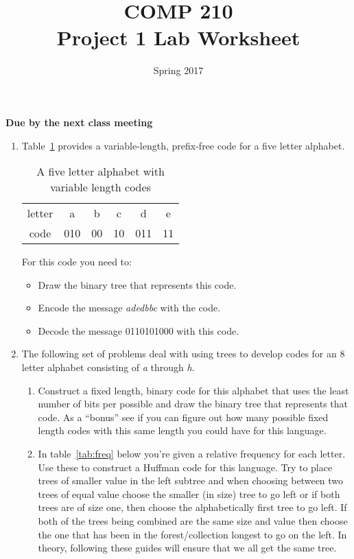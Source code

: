 \documentclass[]{article}
\title{COMP 210 \\ Project 1 Lab Worksheet}
\author{}
\date{Spring 2017}
\begin{document}
\maketitle
\thispagestyle{empty}

\begin{center}
\textbf{Due by the next class meeting}
\end{center}

\begin{enumerate}

\item Table~\ref{tab:code} provides a variable-length, prefix-free code for a five letter alphabet.
\begin{table}[!htpb]
\begin{center}
\begin{tabular}{cccccc}
letter    & a & b & c & d &  e \\
code & 010 &  00 & 10 &  011 & 11
\end{tabular}
\end{center}
\caption{A five letter alphabet with variable length codes}
\label{tab:code}
\end{table}

For this code you need to:
\begin{itemize}
\item Draw the binary tree that represents this code.
\item Encode the message \textit{adedbbc} with the code.
\item Decode the message 0110101000 with this code.
\end{itemize}




\item The following set of problems deal with using trees to develop codes for an 8 letter alphabet consisting of \textit{a} through \textit{h}.
\begin{enumerate}
\item Construct a fixed length, binary code for this alphabet that uses the least number of bits per possible and draw the binary tree that represents that code. As a ``bonus'' see if you can figure out how many possible fixed length codes with this same length you could have for this language.
\newpage \thispagestyle{empty}

\item In table~\ref{tab:freq} below you're given a relative frequency for each letter. Use these to construct a Huffman code for this language. Try to place trees of smaller value in the left subtree and when choosing between two trees of equal value choose the smaller (in size) tree to go left or if both trees are of size one, then choose the alphabetically first tree to go left. If both of the trees being combined are the same size and value then choose the one that has been in the forest/collection longest to go on the left. In theory, following these guides will ensure that we all get the same tree.


\end{enumerate}
\end{enumerate}
\end{document}
